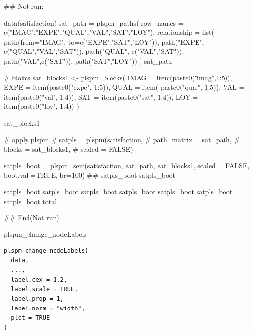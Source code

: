 \documentclass[a4paper]{book}
\begin{document}
\begin{Examples}
\begin{ExampleCode}

\#\# Not run: 

data(satisfaction)
sat_path = plspm_paths(
  row_names = c("IMAG","EXPE","QUAL","VAL","SAT","LOY"),
  relationship = list(
    path(from="IMAG", to=c("EXPE","SAT","LOY")),
    path("EXPE", c("QUAL","VAL","SAT")),
    path("QUAL", c("VAL","SAT")),
    path("VAL",c("SAT")),
    path("SAT","LOY"))
)
sat_path

# blokcs
sat_blocks1 <- plspm_blocks(
  IMAG = item(paste0("imag",1:5)),
  EXPE = item(paste0("expe", 1:5)),
  QUAL = item( paste0("qual", 1:5)),
  VAL = item(paste0("val", 1:4)),
  SAT = item(paste0("sat", 1:4)),
  LOY = item(paste0("loy", 1:4))
)

sat_blocks1

# apply plspm
# satpls = plspm(satisfaction,
#                path_matrix = sat_path,
#                blocks = sat_blocks1,
#                scaled = FALSE)

satpls_boot = plspm_sem(satisfaction, sat_path, sat_blocks1, scaled = FALSE,
                        boot.val =TRUE, br=100)
##
satpls_boot%
satpls_boot%

satpls_boot%
satpls_boot%
satpls_boot%
satpls_boot%
satpls_boot%
satpls_boot%
satpls_boot%
total

## End(Not run)


\end{ExampleCode}
\end{Examples}
%
\begin{Description}
plspm\_change\_nodeLabels
\end{Description}
%
\begin{Usage}
\begin{verbatim}
plspm_change_nodeLabels(
  data,
  ...,
  label.cex = 1.2,
  label.scale = TRUE,
  label.prop = 1,
  label.norm = "width",
  plot = TRUE
)
\end{verbatim}
\end{Usage}
%
\end{document}
